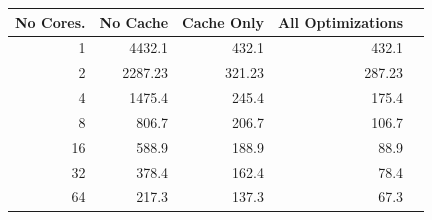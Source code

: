 \begin{table}[ht]
\centering
\label{my-label}
\begin{tabular}{|r|r|r|r|r|}
\hline
No Cores.   & No Cache & Cache Only & All Optimizations \\
\hline
1  & 4432.1   & 432.1      & 432.1             \\
\hline
2  & 2287.23  & 321.23     & 287.23            \\
\hline
4  & 1475.4   & 245.4      & 175.4             \\
\hline
8  & 806.7    & 206.7      & 106.7             \\
\hline
16 & 588.9    & 188.9      & 88.9              \\
\hline
32 & 378.4    & 162.4      & 78.4              \\
\hline
64 & 217.3    & 137.3      & 67.3    \\
\hline
\end{tabular}
\end{table}